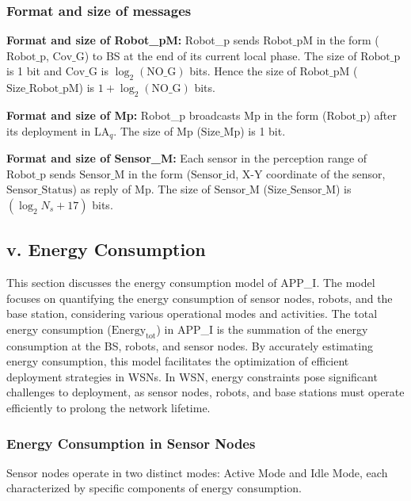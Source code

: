 \documentclass{article}
\begin{document}
\subsubsection*{Format and size of messages}

\noindent\textbf{Format and size of Robot\_pM:} Robot\_p sends $\text{Robot\_pM}$ in the form ($\text{Robot\_p}$, $\text{Cov\_G}$) to BS at the end of its current local phase. The size of $\text{Robot\_p}$ is 1 bit and $\text{Cov\_G}$ is $\log_2(\text{NO\_G})$ bits. Hence the size of $\text{Robot\_pM}$ ($\text{Size\_Robot\_pM}$) is $1 + \log_2(\text{NO\_G})$ bits.

\noindent\textbf{Format and size of Mp:} Robot\_p broadcasts Mp in the form ($\text{Robot\_p}$) after its deployment in LA$_q$. The size of Mp ($\text{Size\_Mp}$) is 1 bit.

\noindent\textbf{Format and size of Sensor\_M:} Each sensor in the perception range of $\text{Robot\_p}$ sends $\text{Sensor\_M}$ in the form ($\text{Sensor\_id}$, X-Y coordinate of the sensor, $\text{Sensor\_Status}$) as reply of Mp. The size of $\text{Sensor\_M}$ ($\text{Size\_Sensor\_M}$) is $(\log_2 N_s + 17)$ bits.

\subsection*{v. Energy Consumption}

This section discusses the energy consumption model of APP\_I. The model focuses on quantifying the energy consumption of sensor nodes, robots, and the base station, considering various operational modes and activities. The total energy consumption ($\text{Energy}_{\text{tot}}$) in APP\_I is the summation of the energy consumption at the BS, robots, and sensor nodes. By accurately estimating energy consumption, this model facilitates the optimization of efficient deployment strategies in WSNs. In WSN, energy constraints pose significant challenges to deployment, as sensor nodes, robots, and base stations must operate efficiently to prolong the network lifetime.

\subsubsection*{Energy Consumption in Sensor Nodes}

Sensor nodes operate in two distinct modes: Active Mode and Idle Mode, each characterized by specific components of energy consumption.
\end{document}
